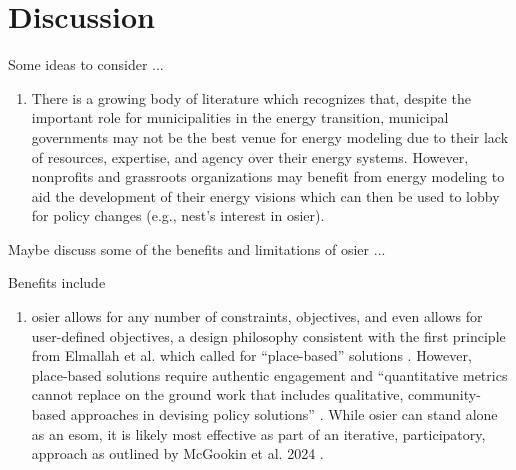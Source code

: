 \section{Discussion}

Some ideas to consider ...

\begin{enumerate}
    \item There is a growing body of literature which recognizes that, despite
    the important role for municipalities in the energy transition, municipal
    governments may not be the best venue for energy modeling due to their lack
    of resources, expertise, and agency over their energy systems. However,
    nonprofits and grassroots organizations may benefit from energy modeling to
    aid the development of their energy visions which can then be used to lobby
    for policy changes (e.g., \ac{nest}'s interest in \ac{osier}).
\end{enumerate}

Maybe discuss some of the benefits and limitations of \ac{osier} ...

Benefits include
\begin{enumerate}
    \item \ac{osier} allows for any number of constraints, objectives, and even
    allows for user-defined objectives, a design philosophy consistent with the
    first principle from Elmallah et al. which called for ``place-based''
    solutions \cite{elmallah_frontlining_2022}. However, place-based solutions
    require authentic engagement and ``quantitative metrics cannot replace on
    the ground work that includes qualitative, community-based approaches in
    devising policy solutions'' \cite{elmallah_frontlining_2022}. While \ac{osier}
    can stand alone as an \ac{esom}, it is likely most effective as part of an 
    iterative, participatory, approach as outlined by McGookin et al. 2024 
    \cite{mcgookin_advancing_2024}.
\end{enumerate}